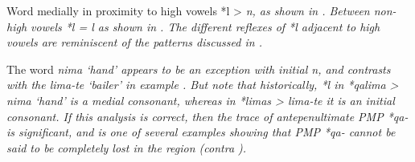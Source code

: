 \newpage
Word medially in proximity to high vowels *l > \it{n},
as shown in .
Between non-high vowels *l = \it{l} as shown in .
The different reflexes of *l adjacent to high vowels are reminiscent
of the patterns discussed in .
\vspace{2pt}


The word \it{nima} ‘hand’ appears to be an exception with initial
\it{n}, and contrasts with the \it{lima-te} ‘bailer’ in example .
But note that historically,
*l in *qalima > \it{nima} ‘hand’ is a medial consonant,
whereas in *limas > \it{lima-te} it is an initial consonant.
If this analysis is correct,
then the trace of antepenultimate PMP *qa- is significant,
and is one of several examples showing that PMP *qa- cannot be
said to be completely lost in the region (contra \citealp[263f]{Blust1993}).

